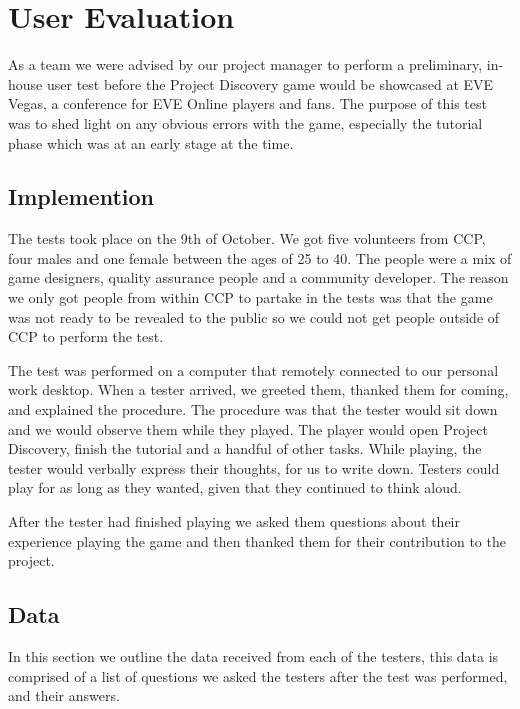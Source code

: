 \section{User Evaluation}\label{sec:userevaluation}

As a team we were advised by our project manager to perform a preliminary, in-house user test before the Project Discovery game would be showcased at EVE Vegas, a conference for EVE Online players and fans. The purpose of this test was to shed light on any obvious errors with the game, especially the tutorial phase which was at an early stage at the time.

\subsection{Implemention}
The tests took place on the 9th of October. We got five volunteers from CCP, four males and one female between the ages of 25 to 40. The people were a mix of game designers, quality assurance people and a community developer. The reason we only got people from within CCP to partake in the tests was that the game was not ready to be revealed to the public so we could not get people outside of CCP to perform the test.

The test was performed on a computer that remotely connected to our personal work desktop. When a tester arrived, we greeted them, thanked them for coming, and explained the procedure. The procedure was that the tester would sit down and we would observe them while they played. The player would open Project Discovery, finish the tutorial and a handful of other tasks. While playing, the tester would verbally express their thoughts, for us to write down. Testers could play for as long as they wanted, given that they continued to think aloud.

After the tester had finished playing we asked them questions about their experience playing the game and then thanked them for their contribution to the project.

\subsection{Data}

In this section we outline the data received from each of the testers, this data is comprised of a list of questions we asked the testers after the test was performed, and their answers.

